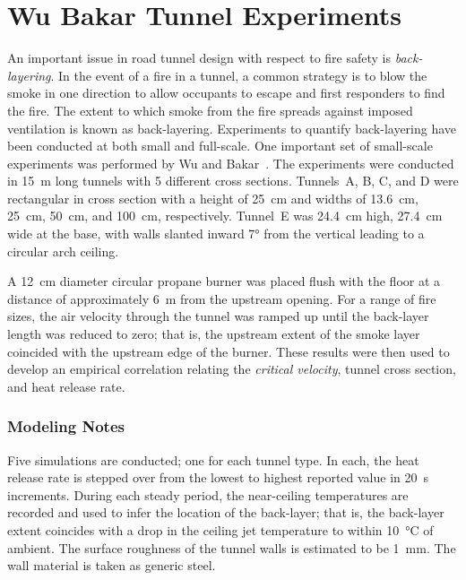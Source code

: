 \section{Wu Bakar Tunnel Experiments}
\label{Wu_Bakar_Tunnels_Description}

An important issue in road tunnel design with respect to fire safety is {\em back-layering}. In the event of a fire in a tunnel, a common strategy is to blow the smoke in one direction to allow occupants to escape and first responders to find the fire. The extent to which smoke from the fire spreads against imposed ventilation is known as back-layering. Experiments to quantify back-layering have been conducted at both small and full-scale. One important set of small-scale experiments was performed by Wu and Bakar~\cite{Wu:FSJ2000}. The experiments were conducted in 15~m long tunnels with 5 different cross sections. Tunnels~A, B, C, and D were rectangular in cross section with a height of 25~cm and widths of 13.6~cm, 25~cm, 50~cm, and 100~cm, respectively. Tunnel~E was 24.4~cm high, 27.4~cm wide at the base, with walls slanted inward 7\unit{\degree} from the vertical leading to a circular arch ceiling.

A 12~cm diameter circular propane burner was placed flush with the floor at a distance of approximately 6~m from the upstream opening. For a range of fire sizes, the air velocity through the tunnel was ramped up until the back-layer length was reduced to zero; that is, the upstream extent of the smoke layer coincided with the upstream edge of the burner. These results were then used to develop an empirical correlation relating the {\em critical velocity}, tunnel cross section, and heat release rate.

\subsubsection{Modeling Notes}

Five simulations are conducted; one for each tunnel type. In each, the heat release rate is stepped over from the lowest to highest reported value in 20~s increments. During each steady period, the near-ceiling temperatures are recorded and used to infer the location of the back-layer; that is, the back-layer extent coincides with a drop in the ceiling jet temperature to within 10~\unit{\degreeCelsius} of ambient. The surface roughness of the tunnel walls is estimated to be 1~mm. The wall material is taken as generic steel.


\FloatBarrier



